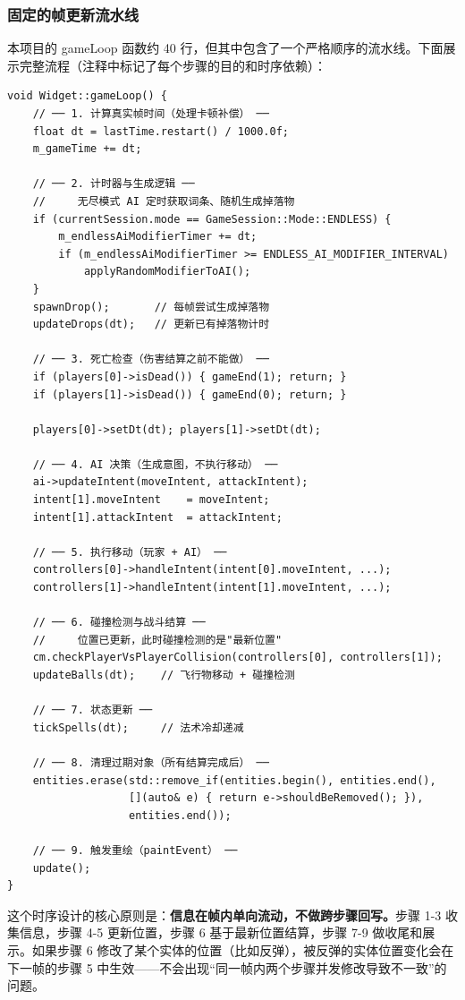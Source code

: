 \documentclass[utf8]{ctexart}
\begin{document}
\subsubsection{固定的帧更新流水线}

本项目的 gameLoop 函数约 40 行，但其中包含了一个严格顺序的流水线。下面展示完整流程（注释中标记了每个步骤的目的和时序依赖）：

\begin{verbatim}
void Widget::gameLoop() {
    // ── 1. 计算真实帧时间（处理卡顿补偿） ──
    float dt = lastTime.restart() / 1000.0f;
    m_gameTime += dt;

    // ── 2. 计时器与生成逻辑 ──
    //     无尽模式 AI 定时获取词条、随机生成掉落物
    if (currentSession.mode == GameSession::Mode::ENDLESS) {
        m_endlessAiModifierTimer += dt;
        if (m_endlessAiModifierTimer >= ENDLESS_AI_MODIFIER_INTERVAL)
            applyRandomModifierToAI();
    }
    spawnDrop();       // 每帧尝试生成掉落物
    updateDrops(dt);   // 更新已有掉落物计时

    // ── 3. 死亡检查（伤害结算之前不能做） ──
    if (players[0]->isDead()) { gameEnd(1); return; }
    if (players[1]->isDead()) { gameEnd(0); return; }

    players[0]->setDt(dt); players[1]->setDt(dt);

    // ── 4. AI 决策（生成意图，不执行移动） ──
    ai->updateIntent(moveIntent, attackIntent);
    intent[1].moveIntent    = moveIntent;
    intent[1].attackIntent  = attackIntent;

    // ── 5. 执行移动（玩家 + AI） ──
    controllers[0]->handleIntent(intent[0].moveIntent, ...);
    controllers[1]->handleIntent(intent[1].moveIntent, ...);

    // ── 6. 碰撞检测与战斗结算 ──
    //     位置已更新，此时碰撞检测的是"最新位置"
    cm.checkPlayerVsPlayerCollision(controllers[0], controllers[1]);
    updateBalls(dt);    // 飞行物移动 + 碰撞检测

    // ── 7. 状态更新 ──
    tickSpells(dt);     // 法术冷却递减

    // ── 8. 清理过期对象（所有结算完成后） ──
    entities.erase(std::remove_if(entities.begin(), entities.end(),
                   [](auto& e) { return e->shouldBeRemoved(); }),
                   entities.end());

    // ── 9. 触发重绘（paintEvent） ──
    update();
}
\end{verbatim}

这个时序设计的核心原则是：\textbf{信息在帧内单向流动，不做跨步骤回写。}步骤 1-3 收集信息，步骤 4-5 更新位置，步骤 6 基于最新位置结算，步骤 7-9 做收尾和展示。如果步骤 6 修改了某个实体的位置（比如反弹），被反弹的实体位置变化会在下一帧的步骤 5 中生效——不会出现“同一帧内两个步骤并发修改导致不一致”的问题。
\end{document}
